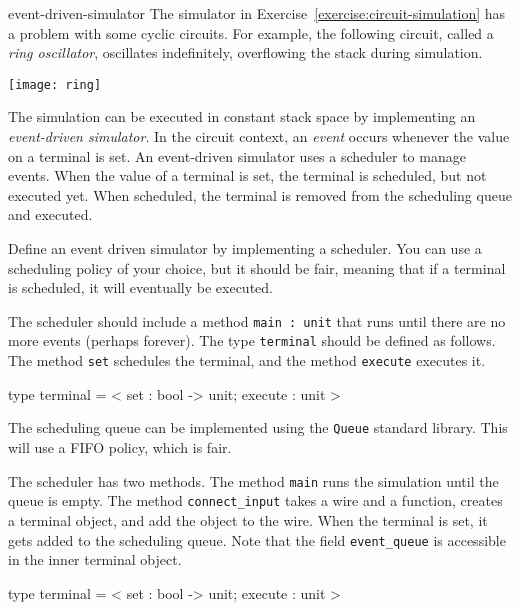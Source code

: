 \begin{exercise}{event-driven-simulator}
The simulator in Exercise~\ref{exercise:circuit-simulation}
has a problem with some cyclic circuits.  For example, the following circuit,
called a \emph{ring oscillator}, oscillates indefinitely, overflowing the stack during simulation.

\begin{center}
\texttt{[image: ring]}
\end{center}
%
The simulation can be executed in constant stack space by implementing an \emph{event-driven
simulator}.  In the circuit context, an \emph{event} occurs whenever the value on a terminal is set.
An event-driven simulator uses a scheduler to manage events.  When the value of a terminal is set,
the terminal is scheduled, but not executed yet.  When scheduled, the terminal is removed from the
scheduling queue and executed.

Define an event driven simulator by implementing a scheduler.  You can use a scheduling policy of
your choice, but it should be fair, meaning that if a terminal is scheduled, it will eventually be
executed.  

The scheduler should include a method \hbox{\lstinline/main : unit/} that runs until there are no more
events (perhaps forever).  The type \hbox{\lstinline/terminal/} should be defined as follows.
The method \hbox{\lstinline/set/} schedules the terminal, and the method \hbox{\lstinline/execute/} executes it.

\begin{ocaml}
type terminal = < set : bool -> unit; execute : unit >
\end{ocaml}

\begin{answer}\ifanswers
The scheduling queue can be implemented using the \hbox{\lstinline/Queue/} standard library.
This will use a FIFO policy, which is fair.

The scheduler has two methods.  The method \hbox{\lstinline/main/} runs the simulation until the
queue is empty.  The method \hbox{\lstinline/connect_input/} takes a wire and a function, creates
a terminal object, and add the object to the wire.  When the terminal is set, it gets
added to the scheduling queue.  Note that the field \hbox{\lstinline/event_queue/} is accessible
in the inner terminal object.

\begin{ocaml}
type terminal = < set : bool -> unit; execute : unit >


\end{ocaml}
\end{answer}
\end{exercise}
